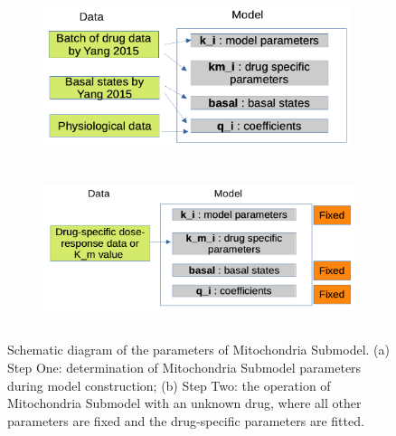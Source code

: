 \documentclass[12pt]{article}
\begin{document}
\begin{figure}[ht]
\begin{subfigure}{\textwidth}
\centering
    \includegraphics[width = 9cm, height = 4.5cm]{mito_step1.png}
    \caption{}
    \label{fig:4_1}
\end{subfigure}
\hfill
\begin{subfigure}{\textwidth}
\centering
    \includegraphics[width = 10cm, height = 4.5cm]{mito_step2.png}
    \caption{}
    \label{fig:4_2}
\end{subfigure}
\hfill
\caption{Schematic diagram of the parameters of Mitochondria Submodel. (a) Step One: determination of Mitochondria Submodel parameters during model construction; (b) Step Two: the operation of Mitochondria Submodel with an unknown drug, where all other parameters are fixed and the drug-specific parameters are fitted.}
\end{figure}
\end{document}
